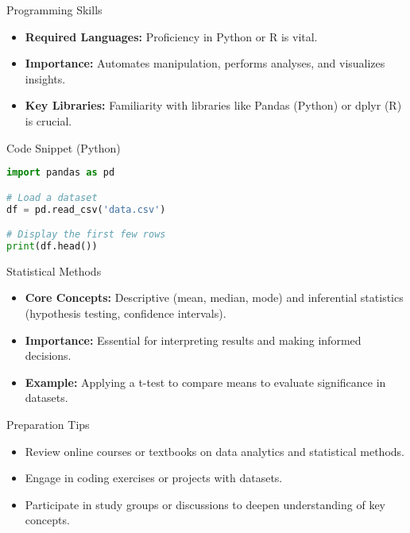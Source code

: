 \documentclass[aspectratio=169]{beamer}
\begin{document}
\begin{frame}[fragile]{Programming Skills}
    \begin{itemize}
        \item \textbf{Required Languages:} Proficiency in Python or R is vital.
        \item \textbf{Importance:} Automates manipulation, performs analyses, and visualizes insights.
        \item \textbf{Key Libraries:} Familiarity with libraries like Pandas (Python) or dplyr (R) is crucial.
    \end{itemize}
    
    \begin{block}{Code Snippet (Python)}
    \begin{lstlisting}[language=Python]
import pandas as pd

# Load a dataset
df = pd.read_csv('data.csv')

# Display the first few rows
print(df.head())
    \end{lstlisting}
    \end{block}
\end{frame}

\begin{frame}[fragile]{Statistical Methods}
    \begin{itemize}
        \item \textbf{Core Concepts:} Descriptive (mean, median, mode) and inferential statistics (hypothesis testing, confidence intervals).
        \item \textbf{Importance:} Essential for interpreting results and making informed decisions.
        \item \textbf{Example:} Applying a t-test to compare means to evaluate significance in datasets.
    \end{itemize}
\end{frame}

\begin{frame}[fragile]{Preparation Tips}
    \begin{itemize}
        \item Review online courses or textbooks on data analytics and statistical methods.
        \item Engage in coding exercises or projects with datasets.
        \item Participate in study groups or discussions to deepen understanding of key concepts.
    \end{itemize}
\end{frame}
\end{document}
